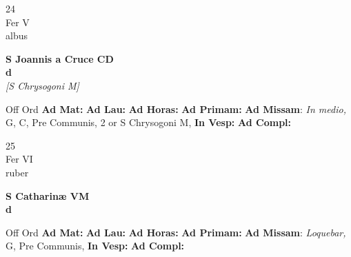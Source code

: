 \documentclass[10pt, openany]{book}
\begin{document}
    \begin{center}
        \begin{minipage}{3.5in}
            \vspace{2em}
            \begin{minipage}{0.5in}
                {\Huge 24} \\
                {\normalsize Fer V} \\
                {\normalsize albus}
            \end{minipage}
            \begin{minipage}{3.0in}
                \textbf{ \large S Joannis a Cruce CD \\
                \textnormal{\normalsize d}} \\ \textit{[S Chrysogoni M]} \\ 
            \end{minipage}
            \begin{justify}Off Ord
                \textbf{Ad Mat: }
                \textbf{Ad Lau: }
                \textbf{Ad Horas: }
                \textbf{Ad Primam: }\textbf{Ad Missam}: \textit{In medio,} G, C, Pre Communis, 2 or S Chrysogoni M,  
                \textbf{In Vesp: }
                \textbf{Ad Compl: }
            \end{justify}
        \end{minipage}
    \end{center}

    \begin{center}
        \begin{minipage}{3.5in}
            \vspace{2em}
            \begin{minipage}{0.5in}
                {\Huge 25} \\
                {\normalsize Fer VI} \\
                {\normalsize ruber}
            \end{minipage}
            \begin{minipage}{3.0in}
                \textbf{ \large S Catharinæ VM \\
                \textnormal{\normalsize d}} \\ 
            \end{minipage}
            \begin{justify}Off Ord
                \textbf{Ad Mat: }
                \textbf{Ad Lau: }
                \textbf{Ad Horas: }
                \textbf{Ad Primam: }\textbf{Ad Missam}: \textit{Loquebar,} G, Pre Communis,  
                \textbf{In Vesp: }
                \textbf{Ad Compl: }
            \end{justify}
        \end{minipage}
    \end{center}
\end{document}
